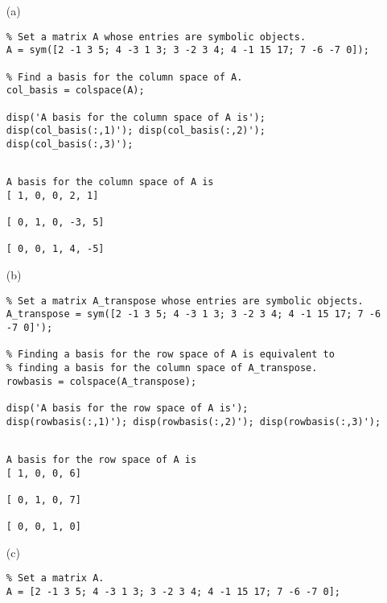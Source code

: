\begin{sol}
\verb""



\begin{itemize}
\item[(a)]
\begin{verbatim}
% Set a matrix A whose entries are symbolic objects.
A = sym([2 -1 3 5; 4 -3 1 3; 3 -2 3 4; 4 -1 15 17; 7 -6 -7 0]);

% Find a basis for the column space of A.
col_basis = colspace(A);

disp('A basis for the column space of A is');
disp(col_basis(:,1)'); disp(col_basis(:,2)'); disp(col_basis(:,3)');
\end{verbatim}


\begin{outputs}
\begin{verbatim}

A basis for the column space of A is
[ 1, 0, 0, 2, 1]

[ 0, 1, 0, -3, 5]

[ 0, 0, 1, 4, -5]
\end{verbatim}
\end{outputs}


\item[(b)]
\begin{verbatim}
% Set a matrix A_transpose whose entries are symbolic objects.
A_transpose = sym([2 -1 3 5; 4 -3 1 3; 3 -2 3 4; 4 -1 15 17; 7 -6 -7 0]');

% Finding a basis for the row space of A is equivalent to
% finding a basis for the column space of A_transpose.
rowbasis = colspace(A_transpose);

disp('A basis for the row space of A is');
disp(rowbasis(:,1)'); disp(rowbasis(:,2)'); disp(rowbasis(:,3)');
\end{verbatim}



\begin{outputs}
\begin{verbatim}

A basis for the row space of A is
[ 1, 0, 0, 6]

[ 0, 1, 0, 7]

[ 0, 0, 1, 0]
\end{verbatim}
\end{outputs}



\item[(c)]
\begin{verbatim}
% Set a matrix A.
A = [2 -1 3 5; 4 -3 1 3; 3 -2 3 4; 4 -1 15 17; 7 -6 -7 0];


\end{verbatim}
\end{itemize}
\end{sol}
